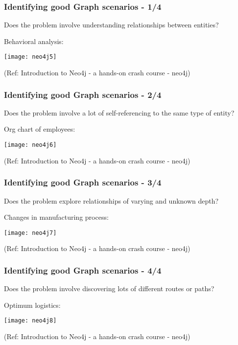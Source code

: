 \begin{frame}\frametitle{Identifying good Graph scenarios - 1/4}

Does the problem involve understanding relationships between entities?

Behavioral analysis:

\begin{center}
\texttt{[image: neo4j5]}
\end{center}	  

{\tiny (Ref: Introduction to Neo4j - a hands-on crash course - neo4j)}
\end{frame}

\begin{frame}\frametitle{Identifying good Graph scenarios - 2/4}

Does the problem involve a lot of self-referencing to the same type of entity?

Org chart of employees:

\begin{center}
\texttt{[image: neo4j6]}
\end{center}	  

{\tiny (Ref: Introduction to Neo4j - a hands-on crash course - neo4j)}
\end{frame}

\begin{frame}\frametitle{Identifying good Graph scenarios - 3/4}

Does the problem explore relationships of varying and unknown depth?

Changes in manufacturing process:

\begin{center}
\texttt{[image: neo4j7]}
\end{center}	  

{\tiny (Ref: Introduction to Neo4j - a hands-on crash course - neo4j)}
\end{frame}

\begin{frame}\frametitle{Identifying good Graph scenarios - 4/4}

Does the problem involve discovering lots of different routes or paths?

Optimum logistics:

\begin{center}
\texttt{[image: neo4j8]}
\end{center}	  

{\tiny (Ref: Introduction to Neo4j - a hands-on crash course - neo4j)}
\end{frame}


